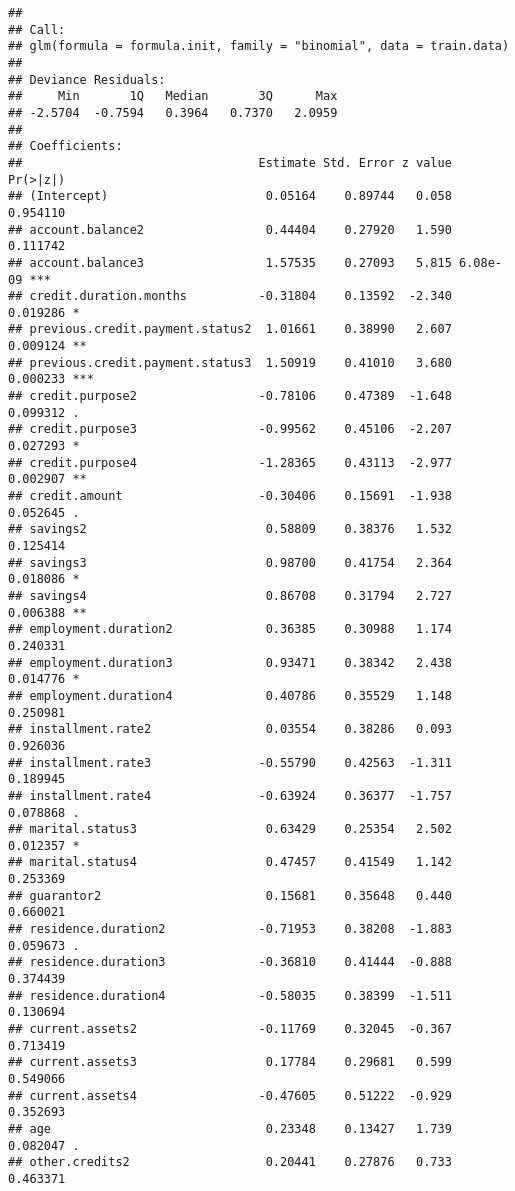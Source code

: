 \documentclass[
]{article}
\begin{document}
\begin{verbatim}
## 
## Call:
## glm(formula = formula.init, family = "binomial", data = train.data)
## 
## Deviance Residuals: 
##     Min       1Q   Median       3Q      Max  
## -2.5704  -0.7594   0.3964   0.7370   2.0959  
## 
## Coefficients:
##                                 Estimate Std. Error z value Pr(>|z|)    
## (Intercept)                      0.05164    0.89744   0.058 0.954110    
## account.balance2                 0.44404    0.27920   1.590 0.111742    
## account.balance3                 1.57535    0.27093   5.815 6.08e-09 ***
## credit.duration.months          -0.31804    0.13592  -2.340 0.019286 *  
## previous.credit.payment.status2  1.01661    0.38990   2.607 0.009124 ** 
## previous.credit.payment.status3  1.50919    0.41010   3.680 0.000233 ***
## credit.purpose2                 -0.78106    0.47389  -1.648 0.099312 .  
## credit.purpose3                 -0.99562    0.45106  -2.207 0.027293 *  
## credit.purpose4                 -1.28365    0.43113  -2.977 0.002907 ** 
## credit.amount                   -0.30406    0.15691  -1.938 0.052645 .  
## savings2                         0.58809    0.38376   1.532 0.125414    
## savings3                         0.98700    0.41754   2.364 0.018086 *  
## savings4                         0.86708    0.31794   2.727 0.006388 ** 
## employment.duration2             0.36385    0.30988   1.174 0.240331    
## employment.duration3             0.93471    0.38342   2.438 0.014776 *  
## employment.duration4             0.40786    0.35529   1.148 0.250981    
## installment.rate2                0.03554    0.38286   0.093 0.926036    
## installment.rate3               -0.55790    0.42563  -1.311 0.189945    
## installment.rate4               -0.63924    0.36377  -1.757 0.078868 .  
## marital.status3                  0.63429    0.25354   2.502 0.012357 *  
## marital.status4                  0.47457    0.41549   1.142 0.253369    
## guarantor2                       0.15681    0.35648   0.440 0.660021    
## residence.duration2             -0.71953    0.38208  -1.883 0.059673 .  
## residence.duration3             -0.36810    0.41444  -0.888 0.374439    
## residence.duration4             -0.58035    0.38399  -1.511 0.130694    
## current.assets2                 -0.11769    0.32045  -0.367 0.713419    
## current.assets3                  0.17784    0.29681   0.599 0.549066    
## current.assets4                 -0.47605    0.51222  -0.929 0.352693    
## age                              0.23348    0.13427   1.739 0.082047 .  
## other.credits2                   0.20441    0.27876   0.733 0.463371    

\end{verbatim}
\end{document}
